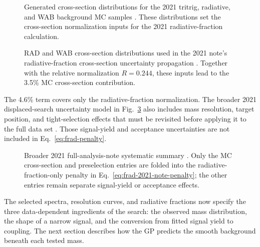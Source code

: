 \begin{figure}[H]
\centering
{}
\caption{Generated cross-section distributions for the 2021 tritrig, radiative, and
WAB background MC samples \cite{HPS2021FullAnalysisNote}. These distributions set the
cross-section normalization inputs for the 2021 radiative-fraction calculation.}
\label{fig:2021-radfrac-xsec-note}
\end{figure}

\begin{figure}[H]
\centering
{}
\caption{RAD and WAB cross-section distributions used in the 2021 note's
radiative-fraction cross-section uncertainty propagation \cite{HPS2021FullAnalysisNote}.
Together with the relative normalization $R=0.244$, these inputs lead to the 3.5\%
MC cross-section contribution.}
\label{fig:2021-radfrac-xsec-syst-note}
\end{figure}

The 4.6\% term covers only the radiative-fraction normalization. The broader 2021
displaced-search uncertainty model in Fig.~\ref{fig:2021-syst-table-note} also includes
mass resolution, target position, and tight-selection effects that must be revisited
before applying it to the full data set \cite[Sec.~9,
Table~58]{HPS2021FullAnalysisNote}. Those signal-yield and acceptance uncertainties are
not included in Eq.~\eqref{eq:frad-penalty}.

\begin{figure}[H]
\centering
{}
\caption{Broader 2021 full-analysis-note systematic summary
\cite{HPS2021FullAnalysisNote}. Only the MC cross-section and preselection entries
are folded into the radiative-fraction-only penalty in
Eq.~\eqref{eq:frad-2021-note-penalty}; the other entries remain separate signal-yield
or acceptance effects.}
\label{fig:2021-syst-table-note}
\end{figure}

The selected spectra, resolution curves, and radiative fractions now specify the three
data-dependent ingredients of the search: the observed mass distribution, the shape of
a narrow signal, and the conversion from fitted signal yield to coupling. The next
section describes how the GP predicts the smooth background beneath each tested mass.
